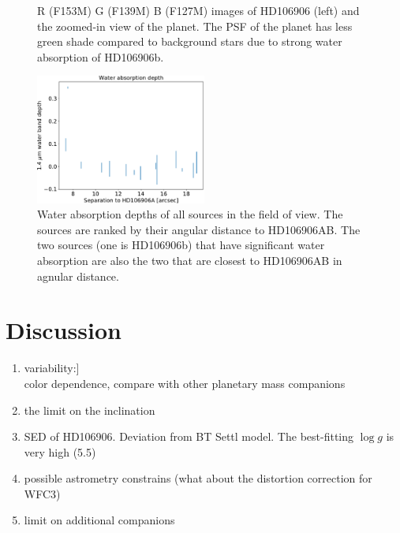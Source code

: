 \documentclass[modern]{aastex62}
\begin{document}
\begin{figure}
  \centering
  \caption{R (F153M) G (F139M) B (F127M) images of HD106906 (left) and the zoomed-in view of the planet. The PSF of the planet has less green shade compared to background stars due to strong water absorption of HD106906b.}
  \label{fig:RGBimage}
\end{figure}
\begin{figure}
  \centering
  \includegraphics[width=0.5\textwidth]{figures/bck_waterdepth.pdf}
  \caption{Water absorption depths of all sources in the field of view. The sources are ranked by their angular distance to HD106906AB. The two sources (one is HD106906b) that have significant water absorption are also the two that are closest to HD106906AB in agnular distance.}
  \label{fig:backgroundsources}
\end{figure}



\section{Discussion}
\begin{enumerate}
\item variability:]\\
  color dependence, compare with other planetary mass companions
\item the limit on the inclination \citep[see][]{Vos2017}
  
\item SED of HD106906. Deviation from BT Settl model. The best-fitting $\log g$ is very high (5.5)
\item possible astrometry constrains (what about the distortion correction for WFC3)\\
\item limit on additional companions\\
\end{enumerate}
\end{document}

